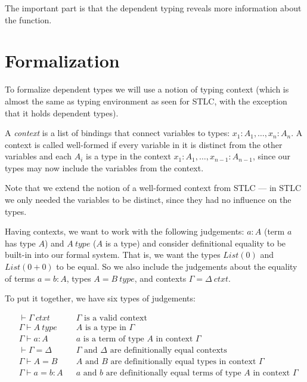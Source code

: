 The important part is that the dependent typing reveals more information about
the function.

\section*{Formalization}

To formalize dependent types we will use a notion of typing context (which is
almost the same as typing environment as seen for STLC, with the exception that
it holds dependent types).

\begin{definition}[Context]
  A \emph{context} is a list of bindings that connect variables to types: $x_1: A_1,
  \dots, x_n: A_n$. A context is called well-formed if every variable in it is
  distinct from the other variables and each $A_i$ is a type in the context $x_1
  : A_1, \dots, x_{n-1} : A_{n-1}$, since our types may now include the variables
  from the context.
\end{definition}

Note that we extend the notion of a well-formed context from STLC --- in STLC
we only needed the variables to be distinct, since they had no influence on the
types.

Having contexts, we want to work with the following judgements: $a : A$ (term
$a$ has type $A$) and $A~type$ ($A$ is a type) and consider definitional
equality to be built-in into our formal system. That is, we want the types
$List(0)$ and $List(0 + 0)$ to be equal. So we also include the judgements
about the equality of terms $a = b : A$, types $A = B~type$, and contexts
$\Gamma = \Delta~ctxt$.

To put it together, we have six types of judgements:

\begin{align*}
  &\vdash \Gamma~ctxt && \text{$\Gamma$ is a valid context} \\
  &\Gamma \vdash A~type && \text{$A$ is a type in $\Gamma$} \\
  &\Gamma \vdash a : A && \text{$a$ is a term of type $A$ in context $\Gamma$} \\
  &\vdash \Gamma = \Delta && \text{$\Gamma$ and $\Delta$ are definitionally equal contexts} \\
  &\Gamma \vdash A = B && \text{$A$ and $B$ are definitionally equal types in context $\Gamma$} \\
  &\Gamma \vdash a = b : A && \text{$a$ and $b$ are definitionally equal terms of type $A$ in context $\Gamma$}
\end{align*}

